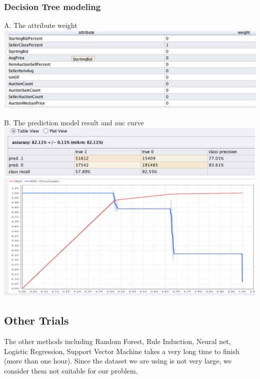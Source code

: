 \documentclass[CEJM,PDF]{cej} %
\begin{document}
\subsubsection{Decision Tree modeling}
{\centering
    A. The attribute weight
    \vspace{3 mm}
    \includegraphics[scale=0.6]{rm-dec-aw.png}
    \par
}


{\centering
    B. The prediction model result and auc curve
    \vspace{3 mm}
    \includegraphics[scale=0.6]{rm-dec-perf.png}
    \vspace{3 mm}
    \includegraphics[scale=0.6]{rm-dec-auc.png}
    \par
}

\subsection{Other Trials}
The other methods including Random Forest, Rule Induction, Neural net, Logistic Regression, Support Vector Machine takes a very long time to finish (more than one hour). Since the dataset we are using is not very large, we consider them not suitable for our problem.
\end{document}
